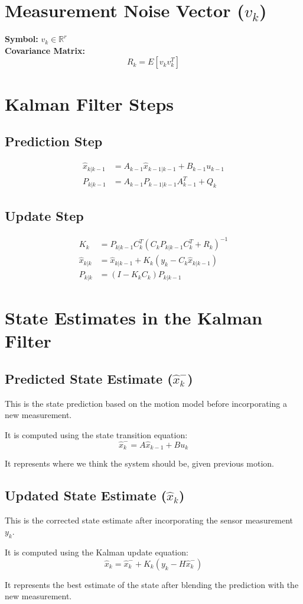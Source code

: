 \documentclass{article}
\begin{document}
\section{Measurement Noise Vector ($v_k$)}
\textbf{Symbol:} $v_k \in \mathbb{R}^{r}$  \\
\textbf{Covariance Matrix:}
\[
    R_k = E[v_k v_k^T]
\]

\section{Kalman Filter Steps}
\subsection{Prediction Step}
\begin{align*}
    \hat{x}_{k|k-1} &= A_{k-1} \hat{x}_{k-1|k-1} + B_{k-1} u_{k-1} \\
    P_{k|k-1} &= A_{k-1} P_{k-1|k-1} A_{k-1}^T + Q_k
\end{align*}

\subsection{Update Step}
\begin{align*}
    K_k &= P_{k|k-1} C_k^T (C_k P_{k|k-1} C_k^T + R_k)^{-1} \\
    \hat{x}_{k|k} &= \hat{x}_{k|k-1} + K_k (y_k - C_k \hat{x}_{k|k-1}) \\
    P_{k|k} &= (I - K_k C_k) P_{k|k-1}
\end{align*}

\section*{State Estimates in the Kalman Filter}

\subsection*{Predicted State Estimate (\(\hat{x}_{k}^{-}\))}

This is the state prediction based on the motion model before incorporating a new measurement.

It is computed using the state transition equation:
\[
\hat{x}_{k}^{-} = A \hat{x}_{k-1} + B u_k
\]

It represents where we think the system should be, given previous motion.

\subsection*{Updated State Estimate (\(\hat{x}_{k}\))}

This is the corrected state estimate after incorporating the sensor measurement \(y_k\).

It is computed using the Kalman update equation:
\[
\hat{x}_{k} = \hat{x}_{k}^{-} + K_k (y_k - H \hat{x}_{k}^{-})
\]

It represents the best estimate of the state after blending the prediction with the new measurement.
\end{document}
